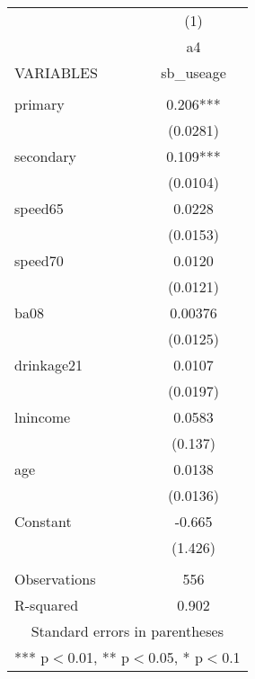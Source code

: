 \documentclass[]{article}
\begin{document}
\begin{tabular}{lc} \hline
 & (1) \\
 & a4 \\
VARIABLES & sb\_useage \\ \hline
 &  \\
primary & 0.206*** \\
 & (0.0281) \\
secondary & 0.109*** \\
 & (0.0104) \\
speed65 & 0.0228 \\
 & (0.0153) \\
speed70 & 0.0120 \\
 & (0.0121) \\
ba08 & 0.00376 \\
 & (0.0125) \\
drinkage21 & 0.0107 \\
 & (0.0197) \\
lnincome & 0.0583 \\
 & (0.137) \\
age & 0.0138 \\
 & (0.0136) \\
Constant & -0.665 \\
 & (1.426) \\
 &  \\
Observations & 556 \\
 R-squared & 0.902 \\ \hline
\multicolumn{2}{c}{ Standard errors in parentheses} \\
\multicolumn{2}{c}{ *** p$<$0.01, ** p$<$0.05, * p$<$0.1} \\
\end{tabular}
\end{document}
